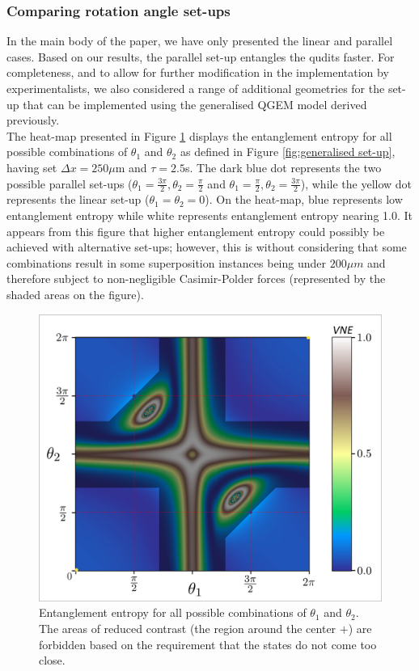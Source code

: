 \documentclass[%
 reprint,
 superscriptaddress,
 amsmath,
 amssymb,
 aps,
 longbibliography
]{revtex4-2}
\begin{document}
\begin{appendices}
\subsubsection{Comparing rotation angle set-ups\label{sec:angles}}

\indent In the main body of the paper, we have only presented the linear and parallel cases. Based on our results, the parallel set-up entangles the qudits faster. For completeness, and to allow for further modification in the implementation by experimentalists, we also considered a range of additional geometries for the set-up that can be implemented using the generalised QGEM model derived previously. \\
\indent The heat-map presented in Figure \ref{heatmap2} displays the entanglement entropy for all possible combinations of $\theta_1$ and $\theta_2$ as defined in Figure \ref{fig:generalised set-up}, having set $\Delta x = 250\mu$m and $\tau = 2.5$s. The dark blue dot represents the two possible parallel set-ups ($\theta_1 = \frac{3\pi}{2}, \theta_2=\frac{\pi}{2}$ and $\theta_1 = \frac{\pi}{2}, \theta_2=\frac{3\pi}{2}$), while the yellow dot represents the linear set-up ($\theta_1 = \theta_2 = 0$). On the heat-map, blue represents low entanglement entropy while white represents entanglement entropy nearing 1.0. It appears from this figure that higher entanglement entropy could possibly be achieved with alternative set-ups; however, this is without considering that some combinations result in some superposition instances being under $200 \mu m$ and therefore subject to non-negligible Casimir-Polder forces (represented by the shaded areas on the figure).
	\begin{figure}
	\centering
	    \includegraphics[width=1.0\columnwidth]{heatmap_VNE_angles_grays.png}\par\medskip
	    \caption{Entanglement entropy for all possible combinations of $\theta_1$ and $\theta_2$. The areas of reduced contrast (the region around the center $+$) are forbidden based on the requirement that the states do not come too close.}\label{heatmap2}
	\end{figure}


\end{appendices}
\end{document}
